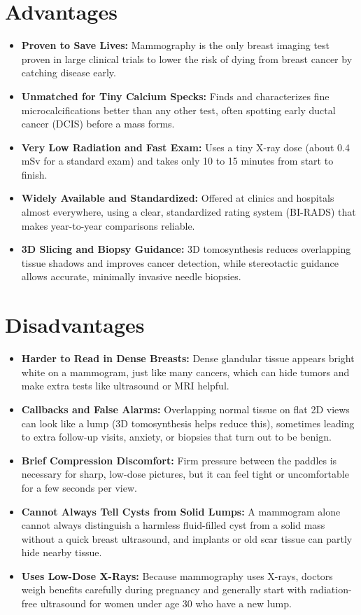 \section{Advantages}

\begin{itemize}
    \item \textbf{Proven to Save Lives:} Mammography is the only breast imaging test proven in large clinical trials to lower the risk of dying from breast cancer by catching disease early.
    \item \textbf{Unmatched for Tiny Calcium Specks:} Finds and characterizes fine microcalcifications better than any other test, often spotting early ductal cancer (DCIS) before a mass forms.
    \item \textbf{Very Low Radiation and Fast Exam:} Uses a tiny X-ray dose (about 0.4 mSv for a standard exam) and takes only 10 to 15 minutes from start to finish.
    \item \textbf{Widely Available and Standardized:} Offered at clinics and hospitals almost everywhere, using a clear, standardized rating system (BI-RADS) that makes year-to-year comparisons reliable.
    \item \textbf{3D Slicing and Biopsy Guidance:} 3D tomosynthesis reduces overlapping tissue shadows and improves cancer detection, while stereotactic guidance allows accurate, minimally invasive needle biopsies.
\end{itemize}

\section{Disadvantages}

\begin{itemize}
    \item \textbf{Harder to Read in Dense Breasts:} Dense glandular tissue appears bright white on a mammogram, just like many cancers, which can hide tumors and make extra tests like ultrasound or MRI helpful.
    \item \textbf{Callbacks and False Alarms:} Overlapping normal tissue on flat 2D views can look like a lump (3D tomosynthesis helps reduce this), sometimes leading to extra follow-up visits, anxiety, or biopsies that turn out to be benign.
    \item \textbf{Brief Compression Discomfort:} Firm pressure between the paddles is necessary for sharp, low-dose pictures, but it can feel tight or uncomfortable for a few seconds per view.
    \item \textbf{Cannot Always Tell Cysts from Solid Lumps:} A mammogram alone cannot always distinguish a harmless fluid-filled cyst from a solid mass without a quick breast ultrasound, and implants or old scar tissue can partly hide nearby tissue.
    \item \textbf{Uses Low-Dose X-Rays:} Because mammography uses X-rays, doctors weigh benefits carefully during pregnancy and generally start with radiation-free ultrasound for women under age 30 who have a new lump.
\end{itemize}

